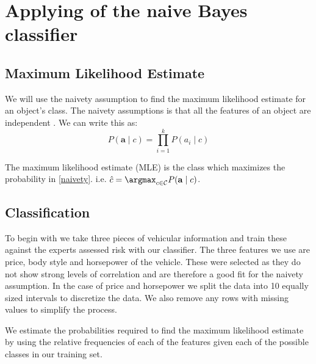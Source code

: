 \chapter{Applying of the naive Bayes classifier}

\section{Maximum Likelihood Estimate}
We will use the naivety assumption to find the maximum likelihood estimate for an object's class. The naivety assumptions is that all the features of an object are independent \cite{Zaffalon01}. We can write this as:
\begin{equation} \label{naivety}
	P(\mathbf{a} \mid c) = \prod_{i=1}^{k} P(a_i \mid c)
\end{equation}

The maximum likelihood estimate (MLE) is the class which maximizes the probability in \cref{naivety}. i.e. $\hat{c} = \argmax_{c \in \mathcal{C}} P(\mathbf{a} \mid c)$.

\section{Classification}
To begin with we take three pieces of vehicular information and train these against the experts assessed risk with our classifier. The three features we use are price, body style and horsepower of the vehicle. These were selected as they do not show strong levels of correlation and are therefore a good fit for the naivety assumption. In the case of price and horsepower we split the data into 10 equally sized intervals to discretize the data. We also remove any rows with missing values to simplify the process.

We estimate the probabilities required to find the maximum likelihood estimate by using the relative frequencies of each of the features given each of the possible classes in our training set.